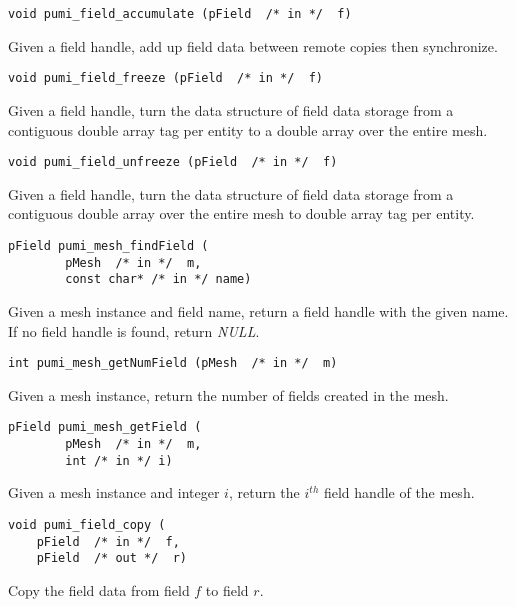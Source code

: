 \begin{verbatim}
void pumi_field_accumulate (pField  /* in */  f)
\end{verbatim}\vspace{-.5cm}\hspace{1cm}
Given a field handle, add up field data between remote copies then synchronize.

\begin{verbatim}
void pumi_field_freeze (pField  /* in */  f)
\end{verbatim}\vspace{-.5cm}\hspace{1cm}
Given a field handle, turn the data structure of field data storage from a contiguous double array tag per entity to a double array over the entire mesh. 

\begin{verbatim}
void pumi_field_unfreeze (pField  /* in */  f)
\end{verbatim}\vspace{-.5cm}\hspace{1cm}
Given a field handle, turn the data structure of field data storage from a contiguous double array over the entire mesh to double array tag per entity.

\begin{verbatim}
pField pumi_mesh_findField (
        pMesh  /* in */  m, 
        const char* /* in */ name)
\end{verbatim}\vspace{-.5cm}\hspace{1cm}
Given a mesh instance and field name, return a field handle with the given name. If no field handle is found, return \emph{NULL}.

\begin{verbatim}
int pumi_mesh_getNumField (pMesh  /* in */  m)
\end{verbatim}\vspace{-.5cm}\hspace{1cm}
Given a mesh instance, return the number of fields created in the mesh.

\begin{verbatim}
pField pumi_mesh_getField (
        pMesh  /* in */  m, 
        int /* in */ i)
\end{verbatim}\vspace{-.5cm}\hspace{1cm}
Given a mesh instance and integer $i$, return the $i^{th}$ field handle of the mesh.

\begin{verbatim}
void pumi_field_copy (
    pField  /* in */  f,
    pField  /* out */  r)
\end{verbatim}\vspace{-.5cm}\hspace{1cm}
Copy the field data from  field $f$ to field $r$.

